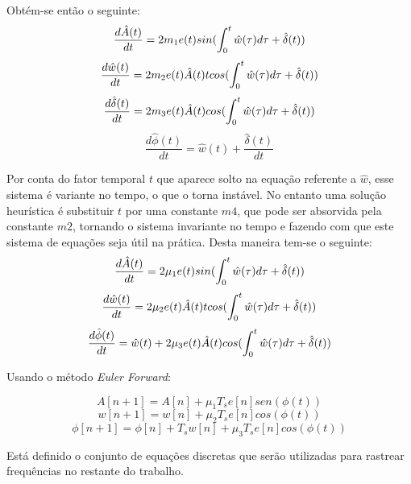 Obtém-se então o seguinte:
\begin{equation}
\frac{d\hat{A}(t)}{dt}=2m_1e(t)sin(\int_{0}^{t}\hat{w}(\tau)d\tau\space+\space\hat{\delta}(t))
\end{equation}
\begin{equation}
\frac{d\hat{w}(t)}{dt}=2m_2e(t)\hat{A}(t)tcos(\int_{0}^{t}\hat{w}(\tau)d\tau\space+\space\hat{\delta}(t))
\end{equation}
\begin{equation}
\frac{d\hat{\delta}(t)}{dt}=2m_3e(t)\hat{A}(t)cos(\int_{0}^{t}\hat{w}(\tau)d\tau\space+\space\hat{\delta}(t))
\end{equation}
\begin{equation}
\frac{d\hat{\phi}(t)}{dt}=\hat{w}(t)+\frac{\hat{\delta}(t)}{dt}
\end{equation}

Por conta do fator temporal $t$ que aparece solto na equação referente a $\hat{w}$, esse sistema é variante no tempo, o que o torna instável. No entanto uma solução heurística é substituir $t$ por uma constante $m4$, que pode ser absorvida pela constante $m2$, tornando o sistema invariante no tempo e fazendo com que este sistema de equações seja útil na prática. Desta maneira tem-se o seguinte:
\begin{equation}
\frac{d\hat{A}(t)}{dt}=2\mu_1e(t)sin(\int_{0}^{t}\hat{w}(\tau)d\tau\space+\space\hat{\delta}(t))
\end{equation}
\begin{equation}
\frac{d\hat{w}(t)}{dt}=2\mu_2e(t)\hat{A}(t)tcos(\int_{0}^{t}\hat{w}(\tau)d\tau\space+\space\hat{\delta}(t))
\end{equation}
\begin{equation}
\frac{d\hat{\phi}(t)}{dt}=\hat{w}(t)+2\mu_3e(t)\hat{A}(t)cos(\int_{0}^{t}\hat{w}(\tau)d\tau\space+\space\hat{\delta}(t))
\end{equation}

Usando o método \textit{Euler Forward}:

\begin{equation}
A[n+1]=A[n]+\mu_1T_s e[n]sen(\phi(t))
\end{equation}
\begin{equation}
w[n+1]=w[n]+\mu_2T_s e[n]cos(\phi(t))
\end{equation}
\begin{equation}
\phi[n+1]=\phi[n] + T_s w[n] + \mu_3T_s e[n]cos(\phi(t))
\end{equation}

Está definido o conjunto de equações discretas que serão utilizadas para rastrear frequências no restante do trabalho.

